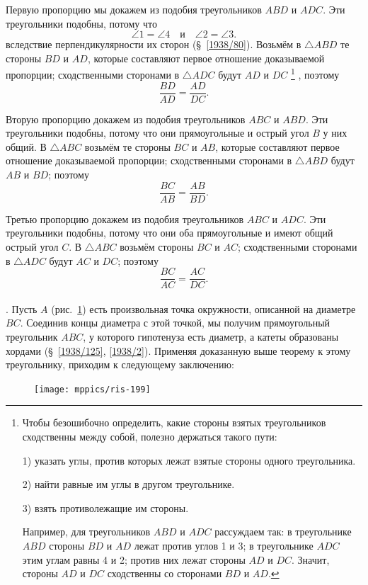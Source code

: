 \documentclass[oneside]{book}
\begin{document}
Первую пропорцию мы докажем из подобия треугольников $ABD$ и $ADC$.
Эти треугольники подобны, потому что
\[\angle 1 = \angle 4\quad \text{и} \quad\angle 2 = \angle 3.\]
вследствие перпендикулярности их сторон (§~\ref{1938/80}).
Возьмём в $\triangle ABD$ те стороны $BD$ и $AD$, которые составляют первое отношение доказываемой пропорции;
сходственными сторонами в $\triangle ADC$ будут $AD$ и $DC$%
\footnote{Чтобы безошибочно определить, какие стороны взятых треугольников сходственны между собой, полезно держаться такого пути:

1) указать углы, против которых лежат взятые стороны одного треугольника.

2) найти равные им углы в другом треугольнике.

3) взять противолежащие им стороны.

Например, для треугольников $ABD$ и $ADC$ рассуждаем так:
в треугольнике $ABD$ стороны $BD$ и $AD$ лежат против углов 1 и 3;
в треугольнике $ADC$ этим углам равны 4 и 2;
против них лежат стороны $AD$ и $DC$.
Значит, стороны $AD$ и $DC$ сходственны со сторонами $BD$ и $AD$.
}%
, поэтому
\[\frac{BD}{AD}=\frac{AD}{DC}.\]

Вторую пропорцию докажем из подобия треугольников $ABC$ и $ABD$.
Эти треугольники подобны, потому что они прямоугольные и острый угол $B$ у них общий.
В $\triangle ABC$ возьмём те стороны $BC$ и $AB$, которые составляют первое отношение доказываемой пропорции;
сходственными сторонами в $\triangle ABD$ будут $AB$ и $BD$;
поэтому
\[\frac{BC}{AB}=\frac{AB}{BD}.\]

Третью пропорцию докажем из подобия треугольников $ABC$ и $ADC$.
Эти треугольники подобны, потому что они оба прямоугольные и имеют общий острый угол $C$.
В $\triangle ABC$ возьмём стороны $BC$ и $AC$;
сходственными сторонами в $\triangle ADC$ будут $AC$ и $DC$;
поэтому
\[\frac{BC}{AC}=\frac{AC}{DC}.\]

\paragraph{}\label{1938/189}
\mbox{.}
Пусть $A$ (рис.~\ref{1938/ris-199}) есть произвольная точка окружности, описанной на диаметре $BC$.
Соединив концы диаметра с этой точкой, мы получим прямоугольный треугольник $ABC$, у которого гипотенуза есть диаметр, а катеты образованы хордами (§~\ref{1938/125}, \ref{1938/2}).
Применяя доказанную выше теорему к этому треугольнику, приходим к следующему заключению:

\begin{figure}
\centering
\texttt{[image: mppics/ris-199]}
\caption{}\label{1938/ris-199}
\end{figure}
\end{document}
